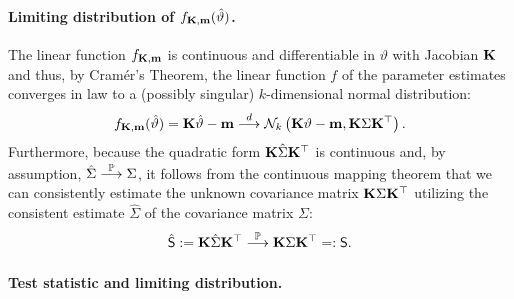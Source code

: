 \documentclass[12pt]{article}
\begin{document}
\paragraph{Limiting distribution of $f_{\mathbf{K},\mathbf{m}}(\hat{\vartheta})$.}

The linear function $f_{\mathbf{K}, \mathbf{m}}$ is continuous and differentiable in
$\vartheta$ with Jacobian $\mathbf{K}$ and thus, by Cram{\'e}r's Theorem, 
the linear function $f$ of the parameter estimates
converges in law to a (possibly singular) $k$-dimensional normal distribution:
\begin{eqnarray} \label{dist_f}
f_{\mathbf{K}, \mathbf{m}}(\hat{\vartheta}) = \mathbf{K} \hat{\vartheta} - \mathbf{m} 
\stackrel{d}{\longrightarrow} \mathcal{N}_k\left(\mathbf{K} \vartheta - \mathbf{m}, \mathbf{K} \Sigma \mathbf{K}^\top\right).
\end{eqnarray}
Furthermore, because the quadratic form $\mathbf{K} \hat{\Sigma} \mathbf{K}^\top$
is continuous and, by assumption, $\hat{\Sigma} \stackrel{\mathbb{P}}{\longrightarrow} \Sigma$, 
it follows from the continuous mapping theorem that we can 
consistently estimate the unknown covariance matrix $\mathbf{K} \Sigma \mathbf{K}^\top$ utilizing
the consistent estimate $\hat{\Sigma}$ of the covariance matrix $\Sigma$:
\begin{eqnarray*}
\hat{\textsf{S}} := \mathbf{K} \hat{\Sigma} \mathbf{K}^\top \stackrel{\mathbb{P}}{\longrightarrow} \mathbf{K} \Sigma \mathbf{K}^\top =: \textsf{S}.
\end{eqnarray*}

\paragraph{Test statistic and limiting distribution.}
\end{document}
